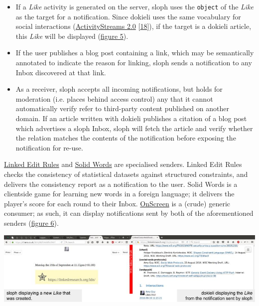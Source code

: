 \documentclass[]{article}
\providecommand{\tightlist}{%
  \setlength{\itemsep}{0pt}\setlength{\parskip}{0pt}}
\begin{document}
\begin{itemize}
\tightlist
\item
  If a \emph{Like} activity is generated on the server, sloph uses the
  \texttt{object} of the \emph{Like} as the target for a notification.
  Since dokieli uses the same vocabulary for social interactions
  (\href{https://www.w3.org/ns/activitystreams-core}{ActivityStreams
  2.0} {[}\protect\hyperlink{ref-18}{18}{]}), if the target is a dokieli
  article, this \emph{Like} will be displayed
  (\protect\hyperlink{figure-sloph-dokieli}{figure 5}).
\item
  If the user publishes a blog post containing a link, which may be
  semantically annotated to indicate the reason for linking, sloph sends
  a notification to any Inbox discovered at that link.
\item
  As a receiver, sloph accepts all incoming notifications, but holds for
  moderation (i.e. places behind access control) any that it cannot
  automatically verify refer to third-party content published on another
  domain. If an article written with dokieli publishes a citation of a
  blog post which advertises a sloph Inbox, sloph will fetch the article
  and verify whether the relation matches the contents of the
  notification before exposing the notification for re-use.
\end{itemize}

\href{http://www.linkededitrules.org/}{Linked Edit Rules} and
\href{https://melvincarvalho.github.io/vocab/}{Solid Words} are
specialised senders. Linked Edit Rules checks the consistency of
statistical datasets against structured constraints, and delivers the
consistency report as a notification to the user. Solid Words is a
clientside game for learning new words in a foreign language; it
delivers the player's score for each round to their Inbox.
\href{https://apps.rhiaro.co.uk/onscreen}{OnScreen} is a (crude) generic
consumer; as such, it can display notifications sent by both of the
aforementioned senders (\protect\hyperlink{figure-ldn-senders}{figure
6}).

\includegraphics{media/images/screenshot-ldn-sloph-dokieli.jpg}
\end{document}
